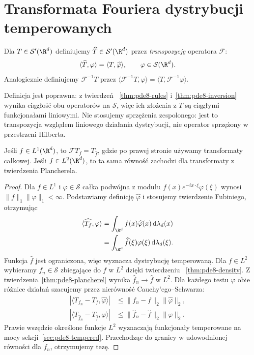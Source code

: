 \section{Transformata Fouriera dystrybucji temperowanych}
\label{sec:pde8-fourier-distributions}

\begin{definicja}
\label{def:pde8-distFT}
Dla $T\in\mathcal S'(\R^d)$ definiujemy $\widehat T\in\mathcal S'(\R^d)$
przez \emph{transpozycję} operatora $\mathcal F$:
\[
 \langle\widehat T,\varphi\rangle
 =\langle T,\widehat\varphi\rangle,
 \qquad\varphi\in\mathcal S(\R^d).
\]
Analogicznie definiujemy $\mathcal F^{-1}T$ przez
$\langle\mathcal F^{-1}T,\varphi\rangle
=\langle T,\mathcal F^{-1}\varphi\rangle$.
\end{definicja}

Definicja jest poprawna: z twierdzeń
~\ref{thm:pde8-rules} i~\ref{thm:pde8-inversion}
wynika ciągłość obu operatorów na $\mathcal S$,
więc ich złożenia z $T$ są ciągłymi funkcjonałami
liniowymi. Nie stosujemy sprzężenia zespolonego:
jest to transpozycja względem liniowego działania
dystrybucji, nie operator sprzężony w przestrzeni Hilberta.

\begin{stwierdzenie}
Jeśli $f\in L^1(\R^d)$, to
$\mathcal F T_f=T_{\widehat f}$, gdzie po prawej
stronie używamy transformaty całkowej.
Jeśli $f\in L^2(\R^d)$, to ta sama równość
zachodzi dla transformaty z twierdzenia Plancherela.
\end{stwierdzenie}
\begin{proof}
Dla $f\in L^1$ i $\varphi\in\mathcal S$
całka podwójna z modułu
$f(x)e^{-ix\cdot\xi}\varphi(\xi)$ wynosi
$\|f\|_1\|\varphi\|_1<\infty$.
Podstawiamy definicję $\widehat\varphi$ i stosujemy
twierdzenie Fubiniego, otrzymując
\[
 \begin{aligned}
 \langle\widehat{T_f},\varphi\rangle
 &=\int_{\R^d}f(x)\widehat\varphi(x)
 \,\mathrm d\lambda_d(x)\\
 &=\int_{\R^d}\widehat f(\xi)\varphi(\xi)
 \,\mathrm d\lambda_d(\xi).
 \end{aligned}
\]
Funkcja $\widehat f$ jest ograniczona, więc
wyznacza dystrybucję temperowaną.
Dla $f\in L^2$ wybieramy $f_n\in\mathcal S$
zbiegające do $f$ w $L^2$ dzięki twierdzeniu
~\ref{thm:pde8-density}.
Z twierdzenia~\ref{thm:pde8-plancherel}
wynika $\widehat f_n\to\widehat f$ w $L^2$.
Dla każdego testu $\varphi$ obie różnice działań
szacujemy przez nierówność Cauchy'ego--Schwarza:
\[
 \begin{aligned}
 |\langle T_{f_n}-T_f,\widehat\varphi\rangle|
 &\le\|f_n-f\|_2\|\widehat\varphi\|_2,\\
 |\langle T_{\widehat f_n}-T_{\widehat f},\varphi\rangle|
 &\le\|\widehat f_n-\widehat f\|_2\|\varphi\|_2.
 \end{aligned}
\]
Prawie wszędzie określone funkcje $L^2$
wyznaczają funkcjonały temperowane na mocy
sekcji~\ref{sec:pde8-tempered}. Przechodząc
do granicy w udowodnionej równości dla $f_n$,
otrzymujemy tezę.
\end{proof}

